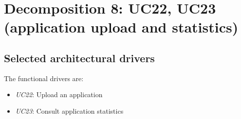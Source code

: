 \section{Decomposition 8: UC22, UC23 (application upload and statistics)}


\subsection*{Selected architectural drivers}
    The functional drivers are:
    \begin{itemize}
        \item \emph{UC22}: Upload an application
        \item \emph{UC23}: Consult application statistics
    \end{itemize}

